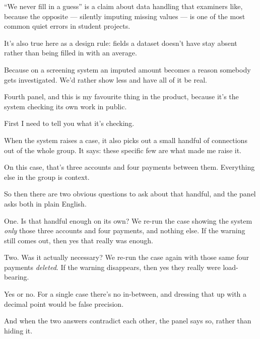 \documentclass[11pt]{article}
\begin{document}
\begin{means}
``We never fill in a guess'' is a claim about data handling that examiners
like, because the opposite --- silently imputing missing values --- is one of
the most common quiet errors in student projects.

It's also true here as a design rule: fields a dataset doesn't have stay absent
rather than being filled in with an average.
\end{means}

\begin{asked}
 Because on a screening system an
imputed amount becomes a reason somebody gets investigated. We'd rather show
less and have all of it be real.
\end{asked}


\begin{saythis}
Fourth panel, and this is my favourite thing in the product, because it's the
system checking its own work in public.

First I need to tell you what it's checking.

When the system raises a case, it also picks out a small handful of connections
out of the whole group. It says: these specific few are what made me raise it.

On this case, that's three accounts and four payments between them. Everything
else in the group is context.

So then there are two obvious questions to ask about that handful, and the
panel asks both in plain English.

One. Is that handful enough on its own? We re-run the case showing the system
\emph{only} those three accounts and four payments, and nothing else. If the
warning still comes out, then yes \bt that really was enough.

Two. Was it actually necessary? We re-run the case again with those same four
payments \emph{deleted}. If the warning disappears, then yes \bt they really
were load-bearing.

Yes or no. For a single case there's no in-between, and dressing that up with a
decimal point would be false precision.

And when the two answers contradict each other, the panel says so, rather than
hiding it.
\end{saythis}
\end{document}
